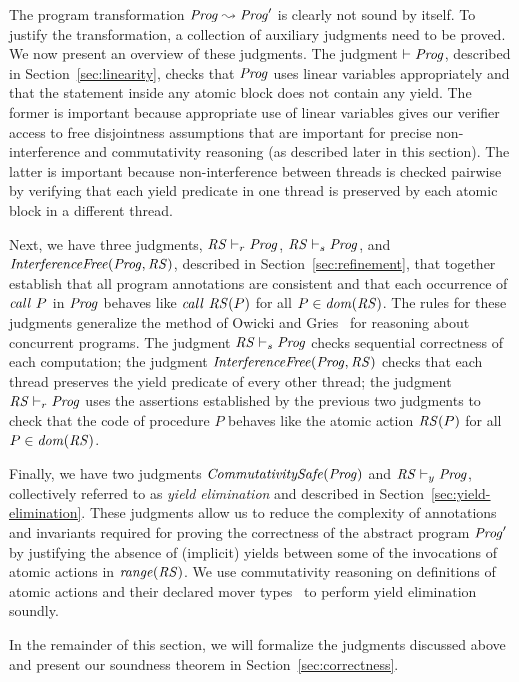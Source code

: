 The program transformation $\mathit{Prog} \leadsto \mathit{Prog}'$ is clearly not sound by itself.
To justify the transformation, a collection of auxiliary judgments need to be proved.
We now present an overview of these judgments.
The judgment $\vdash \mathit{Prog}$, described in Section~\ref{sec:linearity}, 
checks that $\mathit{Prog}$ uses linear variables appropriately and that the statement
inside any atomic block does not contain any yield.
The former is important because appropriate use of linear variables gives our verifier access to free disjointness
assumptions that are important for precise non-interference and commutativity reasoning (as described later in this section).
The latter is important because non-interference between threads is checked pairwise by verifying that each yield predicate
in one thread is preserved by each atomic block in a different thread.

Next, we have three judgments, $\mathit{RS} \vdash_r \mathit{Prog}$, $\mathit{RS} \vdash_s \mathit{Prog}$, and $\mathit{InterferenceFree}(\mathit{Prog}, \mathit{RS})$,
described in Section~\ref{sec:refinement},
that together establish that all program annotations are consistent and that 
each occurrence of $\mathit{call}\ P$ in $\mathit{Prog}$ behaves like $\mathit{call}\ \mathit{RS}(P)$ 
for all $P \in \mathit{dom}(\mathit{RS})$.
The rules for these judgments generalize the method of Owicki and Gries~\cite{OwickiG76} for reasoning about concurrent programs.
The judgment $\mathit{RS} \vdash_s \mathit{Prog}$ checks sequential correctness of each computation;
the judgment $\mathit{InterferenceFree}(\mathit{Prog}, \mathit{RS})$ checks that each thread preserves the
yield predicate of every other thread;
the judgment $\mathit{RS} \vdash_r \mathit{Prog}$ uses the assertions established by the previous two judgments to check that 
the code of procedure $P$ behaves like the atomic action $\mathit{RS}(P)$ for all $P\in\mathit{dom}(\mathit{RS})$.

Finally, we have two judgments $\mathit{CommutativitySafe}(\mathit{Prog})$ and $\mathit{RS} \vdash_y \mathit{Prog}$, collectively 
referred to as {\em yield elimination\/} and described in Section~\ref{sec:yield-elimination}.
These judgments allow us to reduce the complexity of annotations and invariants 
required for proving the correctness of the abstract program $\mathit{Prog}'$
by justifying the absence of (implicit) yields between some of the 
invocations of atomic actions in $\mathit{range}(\mathit{RS})$.
We use commutativity reasoning on definitions of atomic actions and their declared mover types~\cite{FlanaganFLQ08,ElmasQT09}
to perform yield elimination soundly.

In the remainder of this section, we will formalize the judgments discussed above
and present our soundness theorem in Section~\ref{sec:correctness}.

